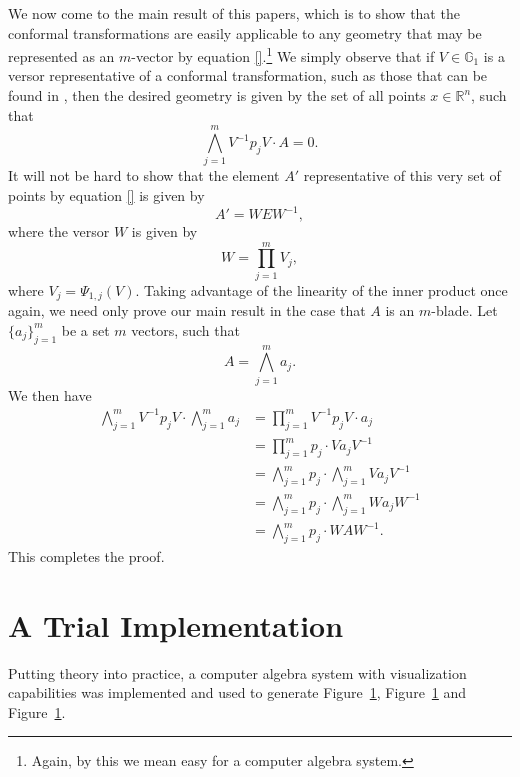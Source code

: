\documentclass{ecgd-l}
\theoremstyle{definition}
\theoremstyle{remark}
\numberwithin{equation}{section}
\newcommand{\G}{\mathbb{G}}
\newcommand{\R}{\mathbb{R}}
\begin{document}
We now come to the main result of this papers, which is to show
that the conformal transformations are easily applicable to any geometry
that may be represented as an $m$-vector by equation \eqref{}.\footnote{Again,
by this we mean easy for a computer algebra system.}
We simply observe that if $V\in\G_1$ is a versor representative
of a conformal transformation, such as those that can be found in \cite{}, then the desired
geometry is given by the set of all points $x\in\R^n$, such that
\begin{equation*}
\bigwedge_{j=1}^m V^{-1}p_jV\cdot A=0.
\end{equation*}
It will not be hard to show that the element $A'$ representative
of this very set of points by equation \eqref{} is given by
\begin{equation*}
A' = WEW^{-1},
\end{equation*}
where the versor $W$ is given by
\begin{equation*}
W = \prod_{j=1}^m V_j,
\end{equation*}
where $V_j=\Psi_{1,j}(V)$.
Taking advantage of the linearity of the inner product once again,
we need only prove our main result in the case that $A$ is an $m$-blade.
Let $\{a_j\}_{j=1}^m$ be a set $m$ vectors, such that
\begin{equation*}
A = \bigwedge_{j=1}^m a_j.
\end{equation*}
We then have
\begin{align*}
\bigwedge_{j=1}^m V^{-1}p_jV\cdot\bigwedge_{j=1}^m a_j &= \prod_{j=1}^m V^{-1}p_jV\cdot a_j \\
 &= \prod_{j=1}^m p_j\cdot Va_jV^{-1} \\
&= \bigwedge_{j=1}^m p_j\cdot\bigwedge_{j=1}^m Va_jV^{-1} \\
&= \bigwedge_{j=1}^m p_j\cdot\bigwedge_{j=1}^m Wa_jW^{-1} \\
&= \bigwedge_{j=1}^m p_j\cdot WAW^{-1}.
\end{align*}
This completes the proof.

\section{A Trial Implementation}

Putting theory into practice, a computer algebra system with
visualization capabilities was implemented and used to generate Figure~\ref{},
Figure~\ref{} and Figure~\ref{}.


\end{document}

